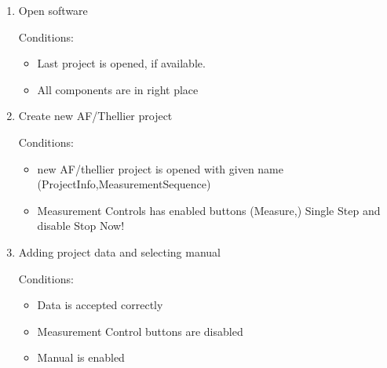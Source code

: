 \begin{enumerate}

\item Open software

Conditions:
\begin{itemize}
\item Last project is opened, if available.
\item All components are in right place
\end{itemize}

\item Create new AF/Thellier project

Conditions:
\begin{itemize}
\item new AF/thellier project is opened with given name (ProjectInfo,MeasurementSequence)
\item Measurement Controls has enabled buttons (Measure,) Single Step and disable Stop Now!
\end{itemize}

\item Adding project data and selecting manual

Conditions:
\begin{itemize}
\item Data is accepted correctly
\item Measurement Control buttons are disabled
\item Manual is enabled
\end{itemize}


\end{enumerate}